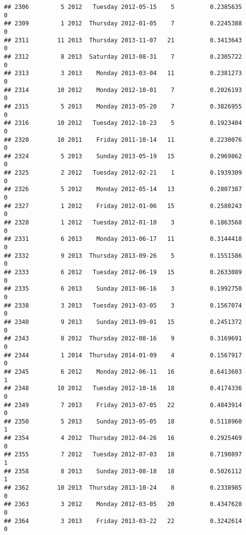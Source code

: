 \documentclass[
]{article}
\begin{document}
\begin{verbatim}
## 2306         5 2012   Tuesday 2012-05-15    5          0.2385635             0
## 2309         1 2012  Thursday 2012-01-05    7          0.2245388             0
## 2311        11 2013  Thursday 2013-11-07   21          0.3413643             0
## 2312         8 2013  Saturday 2013-08-31    7          0.2305722             0
## 2313         3 2013    Monday 2013-03-04   11          0.2381273             0
## 2314        10 2012    Monday 2012-10-01    7          0.2026193             0
## 2315         5 2013    Monday 2013-05-20    7          0.3826955             0
## 2316        10 2012   Tuesday 2012-10-23    5          0.1923404             0
## 2320        10 2011    Friday 2011-10-14   11          0.2230076             0
## 2324         5 2013    Sunday 2013-05-19   15          0.2969862             0
## 2325         2 2012   Tuesday 2012-02-21    1          0.1939309             0
## 2326         5 2012    Monday 2012-05-14   13          0.2807387             0
## 2327         1 2012    Friday 2012-01-06   15          0.2580243             0
## 2328         1 2012   Tuesday 2012-01-10    3          0.1863568             0
## 2331         6 2013    Monday 2013-06-17   11          0.3144418             0
## 2332         9 2013  Thursday 2013-09-26    5          0.1551586             0
## 2333         6 2012   Tuesday 2012-06-19   15          0.2633089             0
## 2335         6 2013    Sunday 2013-06-16    3          0.1992750             0
## 2338         3 2013   Tuesday 2013-03-05    3          0.1567074             0
## 2340         9 2013    Sunday 2013-09-01   15          0.2451372             0
## 2343         8 2012  Thursday 2012-08-16    9          0.3169691             0
## 2344         1 2014  Thursday 2014-01-09    4          0.1567917             0
## 2345         6 2012    Monday 2012-06-11   16          0.6413603             1
## 2348        10 2012   Tuesday 2012-10-16   18          0.4174336             0
## 2349         7 2013    Friday 2013-07-05   22          0.4843914             0
## 2350         5 2013    Sunday 2013-05-05   18          0.5118960             1
## 2354         4 2012  Thursday 2012-04-26   16          0.2925469             0
## 2355         7 2012   Tuesday 2012-07-03   18          0.7190897             1
## 2358         8 2013    Sunday 2013-08-18   18          0.5026112             1
## 2362        10 2013  Thursday 2013-10-24    8          0.2338985             0
## 2363         3 2012    Monday 2012-03-05   20          0.4347628             0
## 2364         3 2013    Friday 2013-03-22   22          0.3242614             0

\end{verbatim}
\end{document}
